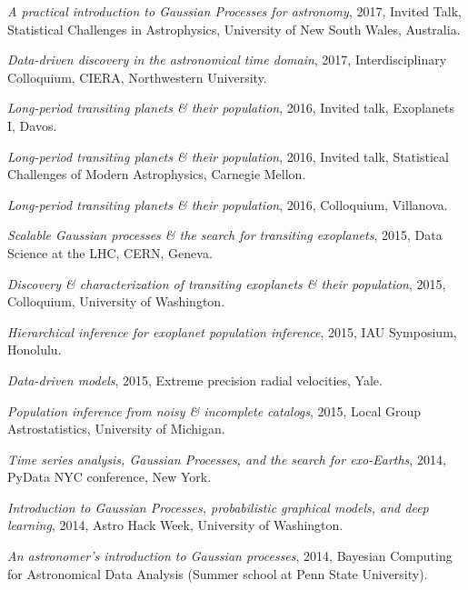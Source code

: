 \documentclass[12pt,letterpaper]{article}
\begin{document}
\begin{list}{}{\cvlist}
  \item \emph{A practical introduction to Gaussian Processes for astronomy},
        2017, Invited Talk, Statistical Challenges in Astrophysics,
        University of New South Wales, Australia.

  \item \emph{Data-driven discovery in the astronomical time domain},
        2017, Interdisciplinary Colloquium, CIERA, Northwestern University.

  \item \emph{Long-period transiting planets \& their population},
        2016, Invited talk, Exoplanets I, Davos.

  \item \emph{Long-period transiting planets \& their population},
        2016, Invited talk, Statistical Challenges of Modern Astrophysics,
        Carnegie Mellon.

  \item \emph{Long-period transiting planets \& their population}, 2016,
        Colloquium, Villanova.

  \item \emph{Scalable Gaussian processes \& the search for transiting
          exoplanets}, 2015, Data Science at the LHC, CERN, Geneva.

  \item \emph{Discovery \& characterization of transiting exoplanets \& their
          population}, 2015, Colloquium, University of Washington.

  \item \emph{Hierarchical inference for exoplanet population inference},
        2015, IAU Symposium, Honolulu.

  \item \emph{Data-driven models}, 2015, Extreme precision radial velocities,
        Yale.

  \item \emph{Population inference from noisy \& incomplete catalogs}, 2015,
        Local Group Astrostatistics, University of Michigan.

  \item \emph{Time series analysis, Gaussian Processes, and the search for
          exo-Earths},
        2014, PyData NYC conference, New York.

  \item \emph{Introduction to Gaussian Processes, probabilistic graphical
          models, and deep learning},
        2014, Astro Hack Week, University of Washington.

  \item \emph{An astronomer's introduction to Gaussian processes},
        2014, Bayesian Computing for Astronomical Data Analysis (Summer school at
        Penn State University).

\end{list}
\end{document}
